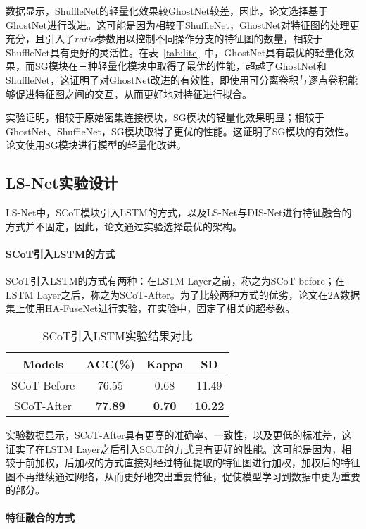 数据显示，ShuffleNet的轻量化效果较GhostNet较差，因此，论文选择基于GhostNet进行改进。这可能是因为相较于ShuffleNet，GhostNet对特征图的处理更充分，且引入了\(ratio\)参数用以控制不同操作分支的特征图的数量，相较于ShuffleNet具有更好的灵活性。在表~\ref{tab:lite}~中，GhostNet具有最优的轻量化效果，而SG模块在三种轻量化模块中取得了最优的性能，超越了GhostNet和ShuffleNet，这证明了对GhostNet改进的有效性，即使用可分离卷积与逐点卷积能够促进特征图之间的交互，从而更好地对特征进行拟合。

实验证明，相较于原始密集连接模块，SG模块的轻量化效果明显；相较于GhostNet、ShuffleNet，SG模块取得了更优的性能。这证明了SG模块的有效性。论文使用SG模块进行模型的轻量化改进。

\subsection{LS-Net实验设计}

LS-Net中，SCoT模块引入LSTM的方式，以及LS-Net与DIS-Net进行特征融合的方式并不固定，因此，论文通过实验选择最优的架构。

\paragraph{SCoT引入LSTM的方式}

SCoT引入LSTM的方式有两种：在LSTM Layer之前，称之为SCoT-before；在LSTM Layer之后，称之为SCoT-After。为了比较两种方式的优劣，论文在2A数据集上使用HA-FuseNet进行实验，在实验中，固定了相关的超参数。
\begin{table}[ht]
    \centering
    \caption{SCoT引入LSTM实验结果对比}
    \label{tab:ls}
    \begin{tabularx}{\textwidth}{CCCC}
      \toprule
      Models & ACC(\%) & Kappa & SD \\
      \midrule
      SCoT-Before & 76.55 & 0.68 & 11.49 \\
      SCoT-After & \textbf{77.89} & \textbf{0.70} & \textbf{10.22} \\
      \bottomrule
    \end{tabularx}
\end{table}

实验数据显示，SCoT-After具有更高的准确率、一致性，以及更低的标准差，这证实了在LSTM Layer之后引入SCoT的方式具有更好的性能。这可能是因为，相较于前加权，后加权的方式直接对经过特征提取的特征图进行加权，加权后的特征图不再继续通过网络，从而更好地突出重要特征，促使模型学习到数据中更为重要的部分。

\paragraph{特征融合的方式}

